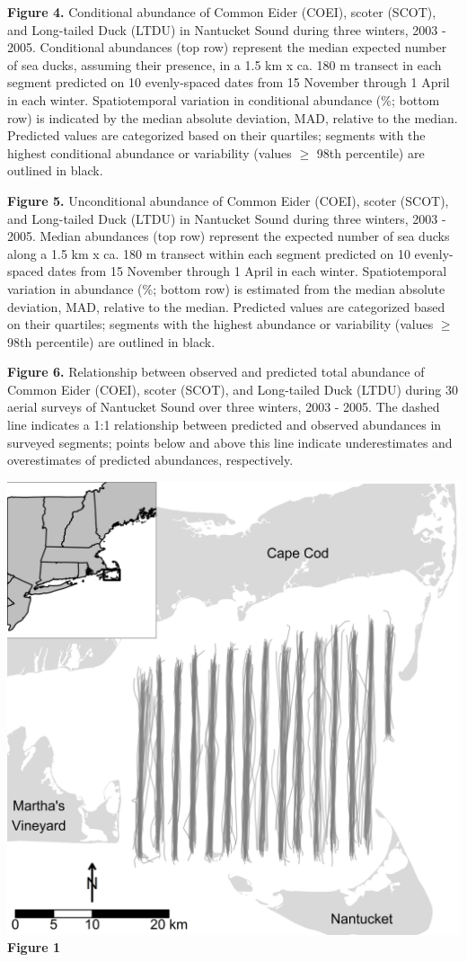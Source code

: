 \textbf{Figure 4.} Conditional abundance of Common Eider (COEI), scoter
(SCOT), and Long-tailed Duck (LTDU) in Nantucket Sound during three
winters, 2003 - 2005. Conditional abundances (top row) represent the
median expected number of sea ducks, assuming their presence, in a 1.5
km x ca. 180 m transect in each segment predicted on 10 evenly-spaced
dates from 15 November through 1 April in each winter. Spatiotemporal
variation in conditional abundance (\%; bottom row) is indicated by the
median absolute deviation, MAD, relative to the median. Predicted values
are categorized based on their quartiles; segments with the highest
conditional abundance or variability (values \(\geq\) 98th percentile)
are outlined in black.

\textbf{Figure 5.} Unconditional abundance of Common Eider (COEI),
scoter (SCOT), and Long-tailed Duck (LTDU) in Nantucket Sound during
three winters, 2003 - 2005. Median abundances (top row) represent the
expected number of sea ducks along a 1.5 km x ca. 180 m transect within
each segment predicted on 10 evenly-spaced dates from 15 November
through 1 April in each winter. Spatiotemporal variation in abundance
(\%; bottom row) is estimated from the median absolute deviation, MAD,
relative to the median. Predicted values are categorized based on their
quartiles; segments with the highest abundance or variability (values
\(\geq\) 98th percentile) are outlined in black.

\textbf{Figure 6.} Relationship between observed and predicted total
abundance of Common Eider (COEI), scoter (SCOT), and Long-tailed Duck
(LTDU) during 30 aerial surveys of Nantucket Sound over three winters,
2003 - 2005. The dashed line indicates a 1:1 relationship between
predicted and observed abundances in surveyed segments; points below and
above this line indicate underestimates and overestimates of predicted
abundances, respectively.

\newpage

\includegraphics{./Figures/Nantucket_study_area.png}\\
\textbf{Figure 1}

